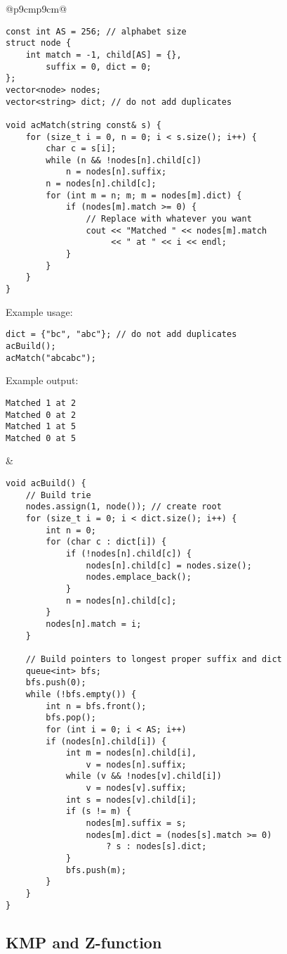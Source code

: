 \documentclass[letterpaper]{article}
\begin{document}
\begin{tabular}{@{}p{9cm}p{9cm}@{}}
\begin{lstlisting}
const int AS = 256; // alphabet size
struct node {
	int match = -1, child[AS] = {},
	    suffix = 0, dict = 0;
};
vector<node> nodes;
vector<string> dict; // do not add duplicates

void acMatch(string const& s) {
	for (size_t i = 0, n = 0; i < s.size(); i++) {
		char c = s[i];
		while (n && !nodes[n].child[c])
			n = nodes[n].suffix;
		n = nodes[n].child[c];
		for (int m = n; m; m = nodes[m].dict) {
			if (nodes[m].match >= 0) {
				// Replace with whatever you want
				cout << "Matched " << nodes[m].match
				     << " at " << i << endl;
			}
		}
	}
}
\end{lstlisting}

Example usage:

\begin{lstlisting}
dict = {"bc", "abc"}; // do not add duplicates
acBuild();
acMatch("abcabc");
\end{lstlisting}

Example output:

\begin{lstlisting}
Matched 1 at 2
Matched 0 at 2
Matched 1 at 5
Matched 0 at 5
\end{lstlisting}
&
\begin{lstlisting}
void acBuild() {
	// Build trie
	nodes.assign(1, node()); // create root
	for (size_t i = 0; i < dict.size(); i++) {
		int n = 0;
		for (char c : dict[i]) {
			if (!nodes[n].child[c]) {
				nodes[n].child[c] = nodes.size();
				nodes.emplace_back();
			}
			n = nodes[n].child[c];
		}
		nodes[n].match = i;
	}

	// Build pointers to longest proper suffix and dict
	queue<int> bfs;
	bfs.push(0);
	while (!bfs.empty()) {
		int n = bfs.front();
		bfs.pop();
		for (int i = 0; i < AS; i++)
		if (nodes[n].child[i]) {
			int m = nodes[n].child[i],
			    v = nodes[n].suffix;
			while (v && !nodes[v].child[i])
				v = nodes[v].suffix;
			int s = nodes[v].child[i];
			if (s != m) {
				nodes[m].suffix = s;
				nodes[m].dict = (nodes[s].match >= 0)
					? s : nodes[s].dict;
			}
			bfs.push(m);
		}
	}
}
\end{lstlisting}
\end{tabular}

\clearpage

\subsection{KMP and Z-function}
\end{document}
